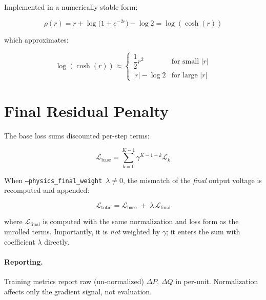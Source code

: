 \documentclass{article}
\begin{document}
Implemented in a numerically stable form:

\begin{equation}
  \rho(r)
  = r + \log\!\bigl(1 + e^{-2r}\bigr) - \log 2
  = \log(\cosh(r))
\end{equation}

which approximates:

\begin{equation}
  \log(\cosh(r))
  \approx
  \begin{cases}
    \dfrac{1}{2}r^2 & \text{for small } |r| \\[4pt]
    |r| - \log 2   & \text{for large } |r|
  \end{cases}
\end{equation}

\section{Final Residual Penalty}

The base loss sums discounted per-step terms:

\begin{equation}
  \mathcal{L}_{\mathrm{base}}
  =
  \sum_{k=0}^{K-1}
  \gamma^{K-1-k}
  \mathcal{L}_k
\end{equation}

When \texttt{--physics\_final\_weight}~$\lambda \neq 0$, the mismatch of
the \emph{final} output voltage is recomputed and appended:

\begin{equation}
  \mathcal{L}_{\mathrm{total}}
  =
  \mathcal{L}_{\mathrm{base}}
  \;+\;
  \lambda\,\mathcal{L}_{\mathrm{final}}
\end{equation}

where $\mathcal{L}_{\mathrm{final}}$ is computed with the same
normalization and loss form as the unrolled terms.  Importantly, it is
\emph{not} weighted by $\gamma$; it enters the sum with coefficient
$\lambda$ directly.

\paragraph{Reporting.}
Training metrics report raw (un-normalized) $\Delta P,\,\Delta Q$ in
per-unit.  Normalization affects only the gradient signal, not evaluation.
\end{document}
